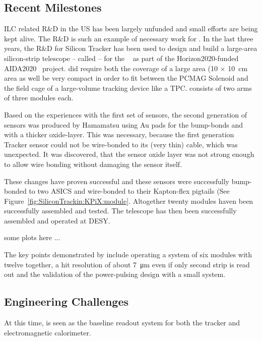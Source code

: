 \subsection{Recent Milestones}
ILC related R\&D in the US has been largely unfunded and small efforts are being kept alive. The \KPIX R\&D is such an example of necessary work for \SID.
In the last three years, the R\&D for \KPIX Silicon Tracker has been used to design and build a large-area silicon-strip 
telescope -- called \LYCORIS -- for the \DIITBF~\cite{desytb2018} as part of the Horizon2020-funded AIDA2020~\cite{AIDA2020} project.
\LYCORIS did require both the coverage of a large area (10 $\times$ \SI{10}{\centi\meter} area as well be very compact in order to fit
between the PCMAG Solenoid and the field cage of a large-volume tracking device like a TPC. \LYCORIS consists of two arms of three modules each.

Based on the experiences with the first set of sensors, the second generation of sensors was produced by Hamamatsu 
using Au pads for the \KPIX bump-bonds and with a thicker oxide-layer. This was necessary, because the first generation Tracker sensor could not be 
wire-bonded to its (very thin) cable, which was unexpected. It was discovered, that the sensor oxide layer was not strong enough 
to allow wire bonding without damaging the sensor itself.

These changes have proven successful and these sensors were successfully bump-bonded to two \KPIX ASICS and wire-bonded to their Kapton-flex pigtails 
(See Figure~\ref{fig:SiliconTrackin:KPiX:module}. Altogether twenty modules haven been successfully assembled and tested. 
The \LYCORIS telescope has then been successfully assembled and operated at DESY. 



some plots here ...

The key points demonstrated by \LYCORIS include operating a system of six modules with twelve \KPIX together, 
a hit resolution of about \SI{7}{\micro\meter} even if only second strip is read out and the 
validation of the power-pulsing design with a small system. 



\subsection{Engineering Challenges}
At this time, \KPIX is seen as the baseline readout system for both the \SID tracker and electromagnetic calorimeter. 

